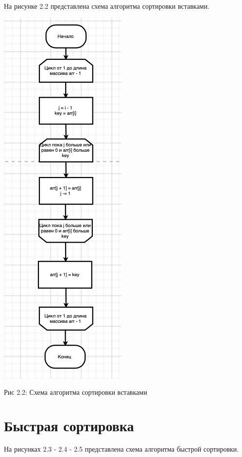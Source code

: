 \documentclass[12pt]{report}
\begin{document}
На рисунке 2.2 представлена схема алгоритма сортировки вставками.

\begin{center}
		\includegraphics[scale=1.2]{InsertSort.png}
		
			Рис 2.2: Схема алгоритма сортировки вставками
\end{center}

\section{Быстрая сортировка}

На рисунках 2.3 - 2.4 - 2.5 представлена схема алгоритма быстрой сортировки.
\end{document}
